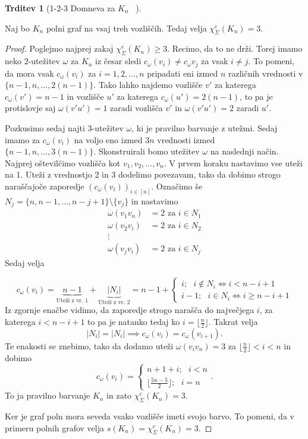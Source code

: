 \documentclass[12pt,a4paper,twoside]{article}
\theoremstyle{definition} %
\theoremstyle{plain} %
\newtheorem{trditev}[definicija]{Trditev}
\newcommand{\ec}{\chi_{\Sigma}^e}
\numberwithin{equation}{section}  %
\begin{document}
\begin{trditev}[1-2-3 Domneva za $K_n$~\citet{kncoloring} ]
\end{trditev}
Naj bo $K_n$ polni graf na vsaj treh vozliščih. Tedaj velja $\ec(K_n) = 3$.
	\begin{proof}


Poglejmo najprej zakaj $\ec(K_n) \ge 3$. Recimo, da to ne drži. Torej imamo neko $2$-utežitev $\omega$ za $K_n$ iz česar sledi $c_{\omega}(v_i) \neq c_{\omega}{v_j}$ za vsak $ i \neq j$. To pomeni, da mora vsak $c_{\omega}(v_i)$ za $i=1,2,\ldots,n$ pripadati eni izmed $n$ različnih vrednosti v $\{n-1, n, \ldots, 2(n-1)\}$. Tako lahko najdemo vozlišče $v'$ za katerega $c_{\omega}(v') = n-1$ in vozlišče $u'$ za katerega $c_{\omega}(u') = 2(n-1)$, to pa je protislovje saj $\omega(v'u') = 1$ zaradi vozlišča $v'$ in $\omega(v'u') = 2$ zaradi $u'$.

 Pozkusimo sedaj najti $3$-utežitev $\omega$, ki je pravilno barvanje z utežmi. Sedaj imamo za $c_{\omega}(v_i)$ na voljo eno izmed $3n$ vrednosti izmed $\{n-1, n, \ldots, 3(n-1)\}$. Skonstruirali bomo utežitev $\omega$ na naslednji način. Najprej oštevilčimo vozlišča kot $v_1, v_2, \ldots, v_n$. V prvem koraku nastavimo vse uteži na 1. Uteži z vrednostjo 2 in 3 dodelimo povezavam, tako da dobimo strogo naraščajoče zaporedje $\left(c_{\omega}(v_i)\right)_{i \in [n]}$. Označimo še $N_j = \{n, n-1, \ldots, n - j + 1\} \setminus \{v_j\}$ in nastavimo
 \begin{equation*}
 \begin{split}
 \omega(v_1 v_n) &= 2 \text{ za } i \in N_1 \\
 \omega(v_2v_i) &=2 \text{ za } i \in N_2\\
 \vdots \\
 \omega(v_jv_i) &= 2 \text{ za } i \in N_j 
 \end{split}
 \end{equation*}
Sedaj velja 

$$ c_{\omega}(v_i) = \underbrace{n-1}_{\text{Uteži z vr. 1}} + \underbrace{|N_i|}_{\text{Uteži z vr. 2}}   = n-1 + 
\begin{cases}
 i; \text{ } i\notin N_i \iff i < n - i +1 \\
  i - 1;\text{ } i \in N_i \iff i \ge n - i + 1
\end{cases} $$
Iz zgornje enačbe vidimo, da zaporedje strogo narašča do največjega $i$, za katerega $ i < n - i +1$ to pa je natanko tedaj ko $ i =  \lfloor \frac{n}{2}\rfloor$. Takrat velja
$$|N_{i}|  =| N_{i}| \implies c_{\omega}(v_i) = c_{\omega}(v_{i+1}).$$
Te enakosti se znebimo, tako da dodamo uteži $\omega(v_iv_n) = 3$ za $\lfloor \frac{n}{2}\rfloor < i < n$ in dobimo
$$c_{\omega}(v_i) =
\begin{cases}
n + 1 + i; \text{ } i < n \\
\lfloor \frac{5n-5}{2}\rfloor;\text{ } i=n
\end{cases} .
 $$
 To ja pravilno barvanje $K_n$ in zato $\ec(K_n) = 3$.

Ker je graf poln mora seveda vsako vozlišče imeti svojo barvo. To pomeni, da v primeru polnih grafov velja $s(K_n) = \ec(K_n) = 3$.
 

\end{proof}
 
\end{document}

